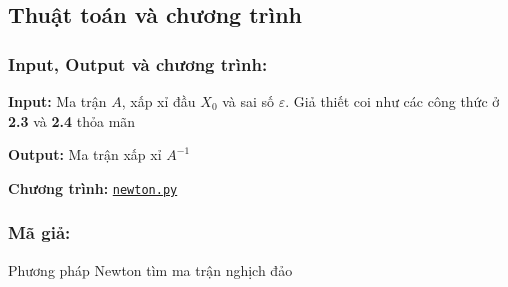     \subsection{Thuật toán và chương trình}
        \subsubsection{Input, Output và chương trình:} 
            \par \textbf{Input:} Ma trận $A$, xấp xỉ đầu $X_{0}$ và sai số $\varepsilon$. Giả thiết coi như các công thức ở \textbf{2.3} và \textbf{2.4} thỏa mãn
            \par \textbf{Output:} Ma trận xấp xỉ $A^{-1}$
            \par \textbf{Chương trình: }\href{https://github.com/Talented-K64MI/MI3040-Numerical-Analysis/tree/master/Topic%202.5%20-%20Matrix%20Inversion/Newton%20Method}{\texttt{newton.py}}


        \subsubsection{Mã giả:}
            \IncMargin{1em}\begin{algorithm}[H]
                \caption{Phương pháp Newton tìm ma trận nghịch đảo \label{IR}}
                \SetAlgoLined     
            \end{algorithm}\DecMargin{1em}


